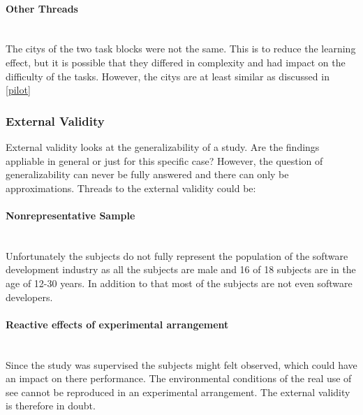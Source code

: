 \paragraph{Other Threads}\mbox{}\\
The \glspl{city} of the two task blocks were not the same. 
This is to reduce the learning effect, but it is possible that they differed in complexity and had impact on the difficulty of the tasks.
However, the \glspl{city} are at least similar as discussed in \ref{pilot}
\subsubsection{External Validity}
External validity looks at the generalizability of a study.
Are the findings appliable in general or just for this specific case?
However, the question of generalizability can never be fully answered and there can only be approximations. 
Threads to the external validity could be:

\paragraph{Nonrepresentative Sample}\mbox{}\\
Unfortunately the subjects do not fully represent the population of the software development industry as all the subjects are male and 16 of 18 subjects are in the age of 12-30 years.
In addition to that most of the subjects are not even software developers.

\paragraph{Reactive effects of experimental arrangement}\mbox{}\\
Since the study was supervised the subjects might felt observed, which could have an impact on there performance.
The environmental conditions of the real use of \gls{see} cannot be reproduced in an experimental arrangement.
The external validity is therefore in doubt.